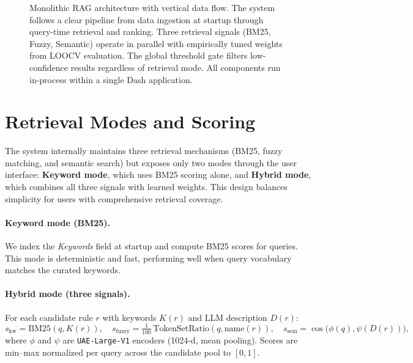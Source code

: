 \begin{figure}[!htbp]
\caption{Monolithic RAG architecture with vertical data flow. The system follows a clear pipeline from data ingestion at startup through query-time retrieval and ranking. Three retrieval signals (BM25, Fuzzy, Semantic) operate in parallel with empirically tuned weights from LOOCV evaluation. The global threshold gate filters low-confidence results regardless of retrieval mode. All components run in-process within a single Dash application.}
\label{fig:intro-architecture}
\end{figure}

\section{Retrieval Modes and Scoring}

The system internally maintains three retrieval mechanisms (BM25, fuzzy matching, and semantic search) but exposes only two modes through the user interface: \textbf{Keyword mode}, which uses BM25 scoring alone, and \textbf{Hybrid mode}, which combines all three signals with learned weights. This design balances simplicity for users with comprehensive retrieval coverage.

\paragraph{Keyword mode (BM25).} 
We index the \emph{Keywords} field at startup and compute BM25 scores for queries. This mode is deterministic and fast, performing well when query vocabulary matches the curated keywords.

\paragraph{Hybrid mode (three signals).} 
For each candidate rule $r$ with keywords $K(r)$ and LLM description $D(r)$:
\[
s_{\text{kw}} = \mathrm{BM25}(q, K(r)),\quad s_{\text{fuzzy}} = \tfrac{1}{100}\,\mathrm{TokenSetRatio}(q, \mathrm{name}(r)),\quad s_{\text{sem}} = \cos\!\big(\phi(q), \psi(D(r))\big),
\]
where $\phi$ and $\psi$ are \texttt{UAE-Large-V1} encoders (1024-d, mean pooling). Scores are min–max normalized per query across the candidate pool to $[0,1]$. 

